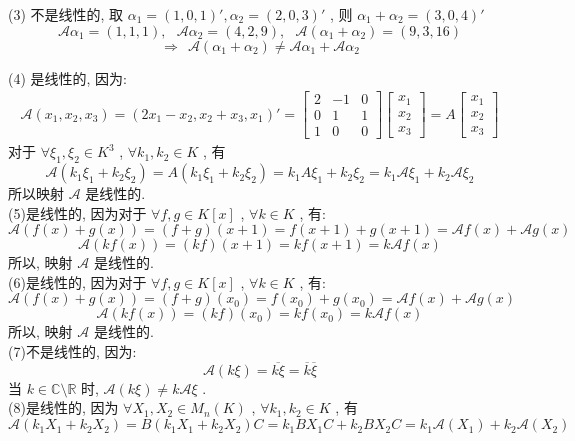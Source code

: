 \documentclass[11pt,a4paper,openany,oneside]{book}
\begin{document}
(3) 不是线性的, 取 $ \alpha_1 = (1, 0, 1)', \alpha_2 = (2, 0, 3)' $ , 则 $ \alpha_1 + \alpha_2 = (3,0,4)' $ 
 $$  \mathcal{A}\alpha_1 = (1, 1, 1),  \ \ \ \mathcal{A}\alpha_2 = (4, 2, 9), \ \ \ \mathcal{A}(\alpha_1 + \alpha_2) = (9, 3, 16)  $$ 
 $$  \Longrightarrow \ \ \mathcal{A}(\alpha_1 + \alpha_2) \neq \mathcal{A}\alpha_1 + \mathcal{A}\alpha_2  $$ 

(4) 是线性的, 因为:
\begin{gather*}
\mathcal{A}(x_1, x_2, x_3) = (2x_1-x_2, x_2 + x_3 , x_1)'=
\begin{bmatrix}
2  &  -1  &  0  \\
0  &  1  &  1  \\
1  &  0  &  0
\end{bmatrix}
\begin{bmatrix}
x_1 \\ x_2  \\ x_3
\end{bmatrix}
=A
\begin{bmatrix}
x_1 \\ x_2  \\ x_3
\end{bmatrix}
\end{gather*}
对于 $ \forall \xi_1, \xi_2 \in K^3 $ ,  $ \forall k_1, k_2 \in K $ , 有
 $$  \mathcal{A}(k_1\xi_1 + k_2\xi_2) = A(k_1\xi_1 + k_2\xi_2) = k_1A\xi_1 + k_2\xi_2 = k_1\mathcal{A}\xi_1 + k_2\mathcal{A}\xi_2  $$ 
所以映射 $ \mathcal{A} $ 是线性的. \\

(5)是线性的, 因为对于 $ \forall f, g \in K[x] $ ,  $ \forall k \in K $ , 有:
 $$  \mathcal{A}(f(x) + g(x)) = (f+g)(x+1) = f(x+1) + g(x+1) = \mathcal{A}f(x) + \mathcal{A}g(x)  $$ 
 $$  \mathcal{A}(kf(x)) = (kf)(x+1) = kf(x+1) = k\mathcal{A}f(x)  $$ 
所以, 映射 $ \mathcal{A} $ 是线性的. \\

(6)是线性的, 因为对于 $ \forall f, g \in K[x] $ ,  $ \forall k \in K $ , 有:
 $$  \mathcal{A}(f(x)+g(x)) = (f+g)(x_0) = f(x_0) + g(x_0) = \mathcal{A}f(x) + \mathcal{A}g(x)  $$ 
 $$  \mathcal{A}(kf(x)) = (kf)(x_0) = kf(x_0) = k\mathcal{A}f(x)  $$ 
所以, 映射 $ \mathcal{A} $ 是线性的. \\

(7)不是线性的, 因为:
 $$  \mathcal{A}(k\xi) = \overline{k\xi} = \overline{k}\overline{\xi}  $$ 
当 $ k \in \mathbb{C} \setminus \mathbb{R}  $ 时,  $ \mathcal{A}(k\xi) \neq k\mathcal{A}\xi $ . \\

(8)是线性的, 因为 $ \forall X_1,X_2 \in M_n(K) $ ,  $ \forall k_1, k_2 \in K $ , 有
 $$  \mathcal{A}(k_1X_1 + k_2X_2) = B(k_1X_1 + k_2X_2)C = k_1BX_1C + k_2BX_2C = k_1\mathcal{A}(X_1) + k_2\mathcal{A}(X_2)  $$   \\  \\  \\
\end{document}
